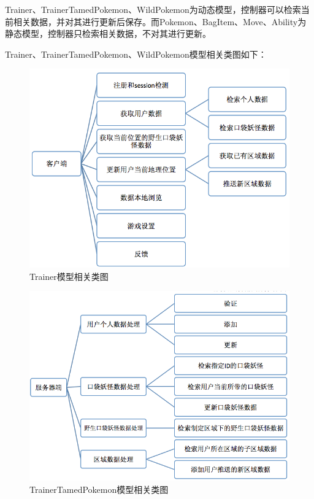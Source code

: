 \documentclass{article}
\begin{document}
\begin{CJK}{UTF8}{gbsn}
  Trainer、TrainerTamedPokemon、WildPokemon为动态模型，控制器可以检索当前相关数据，并对其进行更新后保存。而Pokemon、BagItem、Move、Ability为静态模型，控制器只检索相关数据，不对其进行更新。

  Trainer、TrainerTamedPokemon、WildPokemon模型相关类图如下：

  \begin{figure}[htbp]
		\centering
		\includegraphics[bb=0 0 548 341, scale=0.45]{figure/fig_n05.png}
		\caption{Trainer模型相关类图}
		\label{fig:n05}
	\end{figure}

  \begin{figure}[htbp]
		\centering
		\includegraphics[bb=0 0 548 341, scale=0.45]{figure/fig_n06.png}
		\caption{TrainerTamedPokemon模型相关类图}
		\label{fig:n06}
	\end{figure}


\end{CJK}
\end{document}
